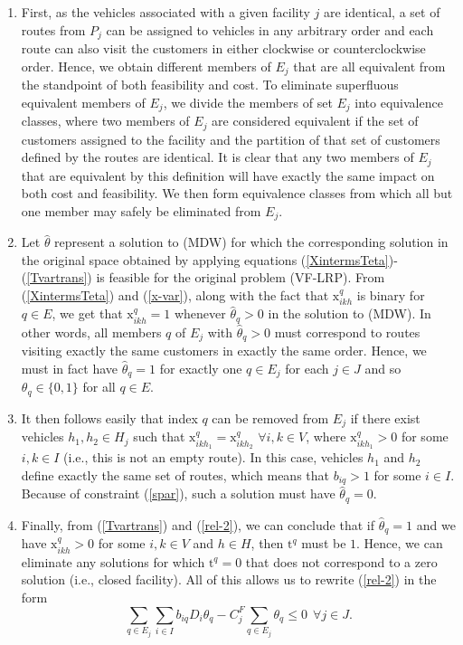 \begin{enumerate}
\item 
First, as the vehicles associated with a given facility $j$ are
identical, a set of routes from $P_j$ can be assigned to vehicles in
any arbitrary order and each route can also visit the customers in
either clockwise or counterclockwise order. Hence, we obtain
different members of $E_j$ that are all equivalent from the standpoint
of both feasibility and cost.
To eliminate superfluous equivalent members of $E_j$, we divide the
members of set $E_j$ into equivalence classes, where two members of
$E_j$ are considered equivalent if the set of customers assigned to
the facility and the partition of that set of customers defined by the
routes are identical. It is clear that any two members of $E_j$ that
are equivalent by this definition will have exactly the same impact on
both cost and feasibility. We then form equivalence classes from which
all but one member may safely be eliminated from $E_j$.

\item Let $\hat{\theta}$ represent a solution to (MDW) for which the
  corresponding solution in the original space obtained by applying
  equations (\ref{XintermsTeta})-(\ref{Tvartrans}) is feasible for the
  original problem (VF-LRP). From (\ref{XintermsTeta}) and
  (\ref{x-var}), along with the fact that $\mbox{x}^q_{ikh}$ is binary
  for $q \in E$, we get that $\mbox{x}^q_{ikh} = 1$ whenever
  $\hat{\theta}_q > 0$ in the solution to (MDW). In other words, all
  members $q$ of $E_j$ with $\hat{\theta}_q > 0$ must correspond to
  routes visiting exactly the same customers in exactly the same
  order. Hence, we must in fact have $\hat{\theta}_q = 1$ for exactly
  one $q \in E_j$ for each $j \in J$ and so $\theta_q \in \{0, 1\}$
  for all $q \in E$.
\item It then follows easily that index $q$ can be removed from $E_j$
if there exist vehicles $h_1, h_2 \in H_j$ such that
$\mbox{x}_{ikh_1}^q = \mbox{x}_{ikh_2}^q$ $\forall i, k \in V$, where
$\mbox{x}_{ikh_1}^q>0$ for some $i, k \in I$ (i.e., this is not an
empty route). In this case, vehicles $h_1$ and $h_2$ define exactly
the same set of routes, which means that $b_{iq}> 1$ for some $i \in
I$. Because of constraint (\ref{spar}), such a solution must have
$\hat{\theta}_q=0$.
\item Finally, from (\ref{Tvartrans}) and (\ref{rel-2}), we can
  conclude that if $\hat{\theta}_q =1$ and we have $\mbox{x}_{ikh}^q>0$
  for some $i, k \in V$ and $h \in H$, then $\mbox{t}^q$ must be $1$.
  Hence, we can eliminate any solutions for which $\mbox{t}^q = 0$
  that does not correspond to a zero solution (i.e., closed facility).
  All of this allows us to rewrite (\ref{rel-2}) in the form
\begin{equation}
\sum_{q \in E_j} \sum_{i \in I} b_{iq} D_i \theta_q  -
C^F_j \sum_{q \in E_j} \theta_q \leq 0 \ \ \forall j \in J. \label{rel-2-new}
\end{equation}
\end{enumerate}   
